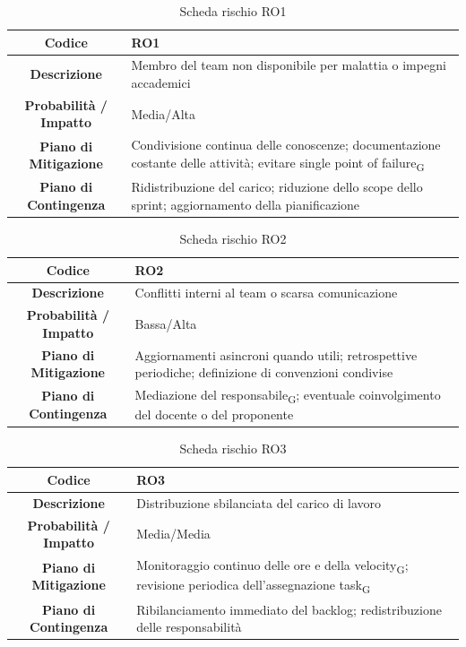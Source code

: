 \begin{table}[H]
	\centering
	\renewcommand{\arraystretch}{1.3}
	\begin{tabularx}{\textwidth}{|c|X|}
		\hline
		\textbf{Codice} & \textbf{RO1} \\
		\hline
		\textbf{Descrizione} & Membro del team non disponibile per malattia o impegni accademici \\
		\hline
		\textbf{Probabilità / Impatto} & Media/Alta \\
		\hline
		\textbf{Piano di Mitigazione} & Condivisione continua delle conoscenze; documentazione costante delle attività; evitare single point of failure\textsubscript{G} \\
		\hline
		\textbf{Piano di Contingenza} & Ridistribuzione del carico; riduzione dello scope dello sprint; aggiornamento della pianificazione \\
		\hline
	\end{tabularx}
	\caption{Scheda rischio RO1}
\end{table}

\begin{table}[H]
	\centering
	\renewcommand{\arraystretch}{1.3}
	\begin{tabularx}{\textwidth}{|c|X|}
		\hline
		\textbf{Codice} & \textbf{RO2} \\
		\hline
		\textbf{Descrizione} & Conflitti interni al team o scarsa comunicazione \\
		\hline
		\textbf{Probabilità / Impatto} & Bassa/Alta \\
		\hline
		\textbf{Piano di Mitigazione} & Aggiornamenti asincroni quando utili; retrospettive periodiche; definizione di convenzioni condivise \\
		\hline
		\textbf{Piano di Contingenza} & Mediazione del responsabile\textsubscript{G}; eventuale coinvolgimento del docente o del proponente \\
		\hline
	\end{tabularx}
	\caption{Scheda rischio RO2}
\end{table}

\begin{table}[H]
	\centering
	\renewcommand{\arraystretch}{1.3}
	\begin{tabularx}{\textwidth}{|c|X|}
		\hline
		\textbf{Codice} & \textbf{RO3} \\
		\hline
		\textbf{Descrizione} & Distribuzione sbilanciata del carico di lavoro \\
		\hline
		\textbf{Probabilità / Impatto} & Media/Media \\
		\hline
		\textbf{Piano di Mitigazione} & Monitoraggio continuo delle ore e della velocity\textsubscript{G}; revisione periodica dell'assegnazione task\textsubscript{G} \\
		\hline
		\textbf{Piano di Contingenza} & Ribilanciamento immediato del backlog; redistribuzione delle responsabilità \\
		\hline
	\end{tabularx}
	\caption{Scheda rischio RO3}
\end{table}

